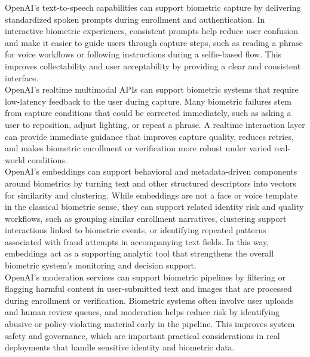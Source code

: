 \documentclass[11pt]{article}
\begin{document}
OpenAI's text-to-speech capabilities can support biometric capture by delivering standardized spoken prompts during enrollment and authentication. In interactive biometric experiences, consistent prompts help reduce user confusion and make it easier to guide users through capture steps, such as reading a phrase for voice workflows or following instructions during a selfie-based flow. This improves collectability and user acceptability by providing a clear and consistent interface. \\

OpenAI's realtime multimodal APIs can support biometric systems that require low-latency feedback to the user during capture. Many biometric failures stem from capture conditions that could be corrected immediately, such as asking a user to reposition, adjust lighting, or repeat a phrase. A realtime interaction layer can provide immediate guidance that improves capture quality, reduces retries, and makes biometric enrollment or verification more robust under varied real-world conditions. \\

OpenAI's embeddings can support behavioral and metadata-driven components around biometrics by turning text and other structured descriptors into vectors for similarity and clustering. While embeddings are not a face or voice template in the classical biometric sense, they can support related identity risk and quality workflows, such as grouping similar enrollment narratives, clustering support interactions linked to biometric events, or identifying repeated patterns associated with fraud attempts in accompanying text fields. In this way, embeddings act as a supporting analytic tool that strengthens the overall biometric system's monitoring and decision support. \\

OpenAI's moderation services can support biometric pipelines by filtering or flagging harmful content in user-submitted text and images that are processed during enrollment or verification. Biometric systems often involve user uploads and human review queues, and moderation helps reduce risk by identifying abusive or policy-violating material early in the pipeline. This improves system safety and governance, which are important practical considerations in real deployments that handle sensitive identity and biometric data. \\
\end{document}
